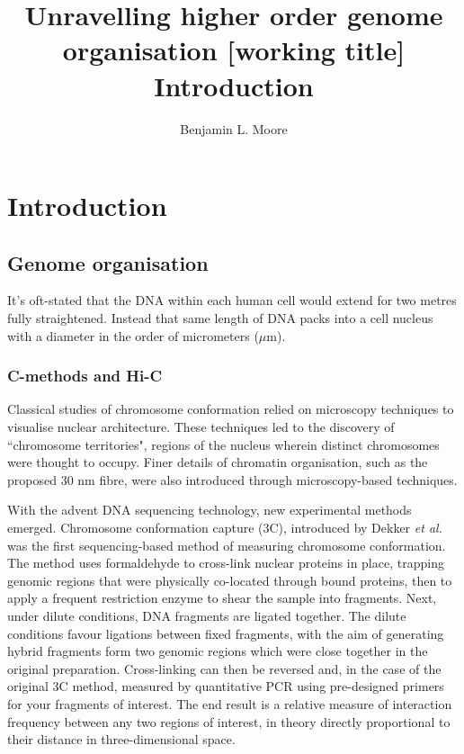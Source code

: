 \documentclass[a4paper,10pt,oneside]{book}
\title{ \vspace{3in} Unravelling higher order genome organisation {\small [working
    title]} \\ \vspace{2em} {\large {\bf Introduction}} }
\author{Benjamin L. Moore}
\begin{document}
\maketitle

\chapter{Introduction}
\section{Genome organisation}

It's oft-stated that the DNA within each human cell would extend for two metres fully straightened. Instead that same length of DNA packs into a cell nucleus with a diameter in the order of micrometers ($\mu$m).

\subsection{C-methods and Hi-C}

Classical studies of chromosome conformation relied on microscopy techniques to visualise nuclear architecture. These techniques led to the discovery of ``chromosome territories", regions of the nucleus wherein distinct chromosomes were thought to occupy. Finer details of chromatin organisation, such as the proposed 30 nm fibre, were also introduced through microscopy-based techniques. 

With the advent DNA sequencing technology, new experimental methods emerged. Chromosome conformation capture (3C), introduced by Dekker \emph{et al.}\cite{Dekker2002} was the first sequencing-based method of measuring chromosome conformation. The method uses formaldehyde to cross-link nuclear proteins in place, trapping genomic regions that were physically co-located through bound proteins, then to apply a frequent restriction enzyme to shear the sample into fragments. Next, under dilute conditions, DNA fragments are ligated together. The dilute conditions favour ligations between fixed fragments, with the aim of generating hybrid fragments form two genomic regions which were close together in the original preparation. Cross-linking can then be reversed and, in the case of the original 3C method, measured by quantitative PCR using pre-designed primers for your fragments of interest. The end result is a relative measure of interaction frequency between any two regions of interest, in theory directly proportional to their distance in three-dimensional space.
\end{document}

